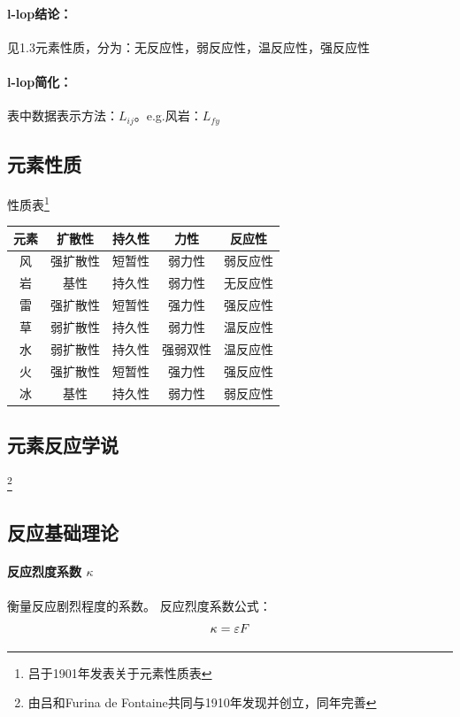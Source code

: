 \documentclass[12pt,a4paper]{article}%
\begin{document}
	\paragraph{l-lop结论：}见1.3元素性质，分为：无反应性，弱反应性，温反应性，强反应性
	\paragraph{l-lop简化：}表中数据表示方法：$L_{ij}$。e.g.风岩：$L_{fy}$


	\subsection{元素性质}
	性质表\footnote[2]{吕于1901年发表关于元素性质表}

	\begin{longtable}{|c|c|c|c|c|}
		\hline
		元素&扩散性&持久性&力性&反应性\\
		\hline
		风&强扩散性&短暂性&弱力性&弱反应性\\
		\hline
		岩&基性&持久性&弱力性&无反应性\\
		\hline
		雷&强扩散性&短暂性&强力性&强反应性\\
		\hline
		草&弱扩散性&持久性&弱力性&温反应性\\
		\hline
		水&弱扩散性&持久性&强弱双性&温反应性\\
		\hline
		火&强扩散性&短暂性&强力性&强反应性\\
		\hline
		冰&基性&持久性&弱力性&弱反应性\\
		\hline
\end{longtable}

\begin{center}
\section{元素反应学说}\footnote[3]{由吕和Furina de Fontaine共同与1910年发现并创立，同年完善}
\end{center}


\subsection{反应基础理论}
\paragraph*{反应烈度系数 $\kappa $ } 衡量反应剧烈程度的系数。
反应烈度系数公式：
\begin{equation}
	\kappa =\varepsilon F \notag
\end{equation}
\end{document}
